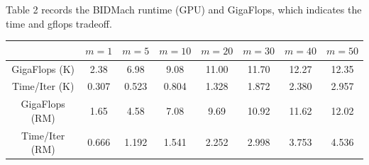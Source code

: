 \documentclass[a0paper,portrait]{baposter}
\begin{document}
\begin{poster}
{Table 2 records the BIDMach runtime (GPU) and GigaFlops, which indicates the time and gflops tradeoff.

\begin{center}
\begin{tabular}{ |c|c|c|c|c|c|c|c| } 
\hline
               & $m=1$ & $m=5$ & $m=10$ & $m=20$ & $m=30$ & $m=40$ & $m=50$  \\
\hline \hline
GigaFlops (K)  & 2.38  & 6.98  & 9.08   & 11.00  & 11.70  & 12.27  & 12.35   \\ 
Time/Iter (K)  & 0.307 & 0.523 & 0.804  & 1.328  & 1.872  & 2.380  & 2.957   \\
\hline 
GigaFlops (RM) & 1.65  & 4.58  & 7.08   & 9.69   & 10.92  & 11.62  & 12.02   \\ 
Time/Iter (RM) & 0.666 & 1.192 & 1.541  & 2.252  & 2.998  & 3.753  & 4.536   \\
\hline
\end{tabular}
\end{center}

}


\end{poster}
\end{document}

